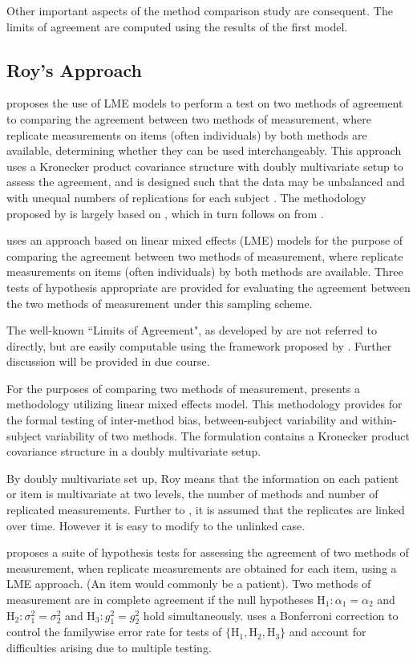\documentclass[12pt, a4paper]{report}
\theoremstyle{plain}
\theoremstyle{definition}
\theoremstyle{remark}
\begin{document}
	Other important aspects of the method comparison study are consequent. The limits of agreement are computed using the results of the first model.
	
	\subsection{Roy's Approach}
	\citet{ARoy2009} proposes the use of LME models to perform a test on two methods of agreement to comparing the agreement between two methods of measurement, where replicate measurements on items (often individuals) by both methods are available, determining whether they can be used
	interchangeably. This approach uses a Kronecker product covariance structure with doubly multivariate setup to
	assess the agreement, and is designed such that the data may be unbalanced and with unequal numbers of replications for each subject \citep{ARoy2009}.
	The methodology proposed by \citet{ARoy2009} is largely based on \citet{hamlett}, which in turn follows on from \citet{lam}.
	
	\citet{ARoy2009} uses an approach based on linear mixed effects (LME) models for the purpose of comparing the agreement between two methods of measurement, where replicate measurements on items (often individuals) by both methods are available. Three tests of hypothesis appropriate are provided for evaluating the agreement between the two methods of measurement under this sampling scheme. 
	
	
	The well-known ``Limits of Agreement", as developed by \citet{BA86} are not referred to directly, but are easily computable using the framework proposed by \citet{ARoy2009}. Further discussion will be provided in due course.
	
	
	For the purposes of comparing two methods of measurement, \citet{ARoy2009} presents a methodology utilizing linear mixed effects model. This methodology provides for the formal testing of inter-method bias, between-subject variability and within-subject variability of two methods. The formulation contains a Kronecker product covariance structure in a doubly multivariate setup. 
	
	By doubly multivariate set up, Roy means that the information on each patient or item is multivariate at two levels, the number of methods and number of replicated measurements. Further to \citet{lam}, it is assumed that the replicates are linked over time. However it is easy to modify to the unlinked case.
	
	\citet{ARoy2009} proposes a suite of hypothesis tests for assessing the agreement of two methods of measurement, when replicate measurements are obtained for each item, using a LME approach. (An item would commonly be a patient).  
	Two methods of measurement are in complete agreement if the null hypotheses $\mathrm{H}_1\colon \alpha_1 = \alpha_2$ and $\mathrm{H}_2\colon \sigma^2_1 = \sigma^2_2 $ and $\mathrm{H}_3\colon g^2_1= g^2_2$ hold simultaneously. \citet{ARoy2009} uses a Bonferroni correction to control the familywise error rate for tests of $\{\mathrm{H}_1, \mathrm{H}_2, \mathrm{H}_3\}$ and account for difficulties arising due to multiple testing. 
	
\end{document}
